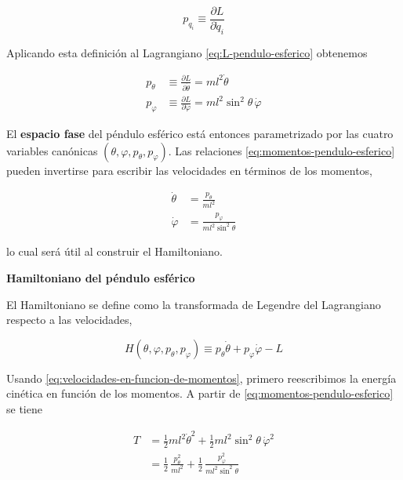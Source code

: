 \documentclass{article}
\begin{document}
\[
p_{q_{i}} \equiv \frac{\partial L}{\partial \dot q_{i}}
\]

Aplicando esta definición al Lagrangiano \eqref{eq:L-pendulo-esferico} obtenemos

\begin{equation}
\begin{split}
p_{\theta} &\equiv \frac{\partial L}{\partial \dot\theta}
           = m l^{2}\dot\theta \\[4pt]
p_{\varphi} &\equiv \frac{\partial L}{\partial \dot\varphi}
            = m l^{2}\sin^{2}\theta\,\dot\varphi
\end{split}\label{eq:momentos-pendulo-esferico}
\end{equation}

El \textbf{espacio fase} del péndulo esférico está entonces parametrizado por las
cuatro variables canónicas \((\theta,\varphi,p_{\theta},p_{\varphi})\).  
Las relaciones \eqref{eq:momentos-pendulo-esferico} pueden invertirse para escribir
las velocidades en términos de los momentos,

\begin{equation}
\begin{split}
\dot\theta &= \frac{p_{\theta}}{m l^{2}} \\[4pt]
\dot\varphi &= \frac{p_{\varphi}}{m l^{2}\sin^{2}\theta}
\end{split}\label{eq:velocidades-en-funcion-de-momentos}
\end{equation}

lo cual será útil al construir el Hamiltoniano.

\vspace{0.5cm}
\textbf{Hamiltoniano del péndulo esférico}

El Hamiltoniano se define como la transformada de Legendre del Lagrangiano respecto
a las velocidades,

\[
H(\theta,\varphi,p_{\theta},p_{\varphi})
\equiv p_{\theta}\dot\theta + p_{\varphi}\dot\varphi - L
\]

Usando \eqref{eq:velocidades-en-funcion-de-momentos}, primero reescribimos la
energía cinética en función de los momentos. A partir de \eqref{eq:momentos-pendulo-esferico}
se tiene

\begin{equation}
\begin{split}
T &= \frac{1}{2}m l^{2}\dot\theta^{2}
   + \frac{1}{2}m l^{2}\sin^{2}\theta\,\dot\varphi^{2} \\[4pt]
  &= \frac{1}{2}\,\frac{p_{\theta}^{2}}{m l^{2}}
   + \frac{1}{2}\,\frac{p_{\varphi}^{2}}{m l^{2}\sin^{2}\theta}
\end{split}\label{eq:T-en-momentos}
\end{equation}
\end{document}
